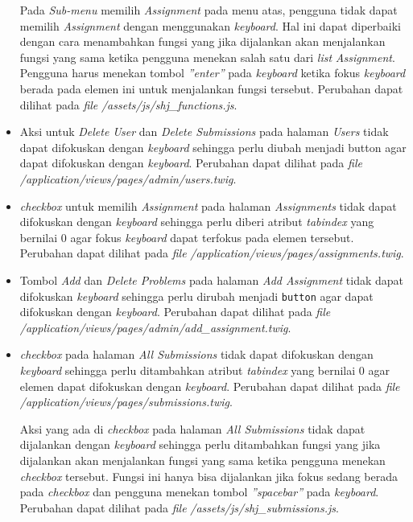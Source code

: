 \begin{itemize}
	Pada \textit{Sub-menu} memilih \textit{Assignment} pada menu atas, pengguna tidak dapat memilih \textit{Assignment} dengan menggunakan \textit{keyboard}. Hal ini dapat diperbaiki dengan cara menambahkan fungsi yang jika dijalankan akan menjalankan fungsi yang sama ketika pengguna menekan salah satu dari \textit{list} \textit{Assignment}. Pengguna harus menekan tombol \textit{''enter''} pada \textit{keyboard} ketika fokus \textit{keyboard} berada pada elemen ini untuk menjalankan fungsi tersebut. Perubahan dapat dilihat pada \textit{file} \textit{/assets/js/shj\_functions.js}.
	
	\item Aksi untuk \textit{Delete User} dan \textit{Delete Submissions} pada halaman \textit{Users} tidak dapat difokuskan dengan \textit{keyboard} sehingga perlu diubah menjadi button agar dapat difokuskan dengan \textit{keyboard}. Perubahan dapat dilihat pada \textit{file} \textit{/application/views/pages/admin/users.twig}.

	\item \textit{checkbox} untuk memilih \textit{Assignment} pada halaman \textit{Assignments} tidak dapat difokuskan dengan \textit{keyboard} sehingga perlu diberi atribut \textit{tabindex} yang bernilai 0 agar fokus \textit{keyboard} dapat terfokus pada elemen tersebut. Perubahan dapat dilihat pada \textit{file} \textit{/application/views/pages/assignments.twig}.

	\item Tombol \textit{Add} dan \textit{Delete Problems} pada halaman \textit{Add Assignment} tidak dapat difokuskan \textit{keyboard} sehingga perlu dirubah menjadi \texttt{button} agar dapat difokuskan dengan \textit{keyboard}. Perubahan dapat dilihat pada \textit{file} \textit{/application/views/pages/admin/add\_assignment.twig}.

	\item \textit{checkbox} pada halaman \textit{All Submissions} tidak dapat difokuskan dengan \textit{keyboard} sehingga perlu ditambahkan atribut \textit{tabindex} yang bernilai 0 agar elemen dapat difokuskan dengan \textit{keyboard}. Perubahan dapat dilihat pada \textit{file} \textit{/application/views/pages/submissions.twig}.
	
	Aksi yang ada di \textit{checkbox} pada halaman \textit{All Submissions} tidak dapat dijalankan dengan \textit{keyboard} sehingga perlu ditambahkan fungsi yang jika dijalankan akan menjalankan fungsi yang sama ketika pengguna menekan \textit{checkbox} tersebut. Fungsi ini hanya bisa dijalankan jika fokus sedang berada pada \textit{checkbox} dan pengguna menekan tombol \textit{''spacebar''} pada \textit{keyboard}. Perubahan dapat dilihat pada \textit{file} \textit{/assets/js/shj\_submissions.js}.
	

\end{itemize}
